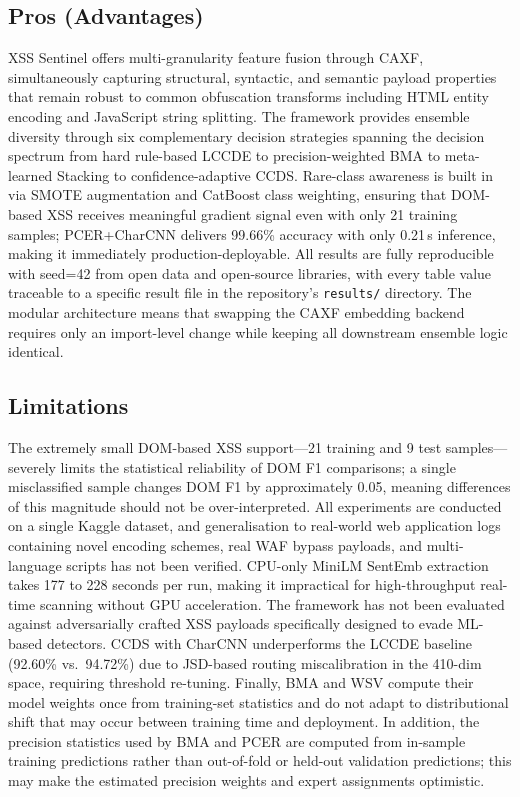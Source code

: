 \documentclass[11pt,a4paper]{article}
\begin{document}
\subsection{Pros (Advantages)}

XSS Sentinel offers multi-granularity feature fusion through CAXF, simultaneously capturing
structural, syntactic, and semantic payload properties that remain robust to common obfuscation
transforms including HTML entity encoding and JavaScript string splitting. The framework provides
ensemble diversity through six complementary decision strategies spanning the decision spectrum from
hard rule-based LCCDE to precision-weighted BMA to meta-learned
Stacking to confidence-adaptive CCDS. Rare-class awareness is built in via SMOTE augmentation and
CatBoost class weighting, ensuring that DOM-based XSS receives meaningful gradient signal even with
only 21 training samples; PCER+CharCNN delivers 99.66\% accuracy with only 0.21\,s inference,
making it immediately production-deployable. All results are fully reproducible with seed=42 from
open data and open-source libraries, with every table value traceable to a specific result file in
the repository's \texttt{results/} directory. The modular architecture means that swapping the CAXF
embedding backend requires only an import-level change while keeping all downstream ensemble logic
identical.

\subsection{Limitations}

The extremely small DOM-based XSS support---21 training and 9 test samples---severely limits the
statistical reliability of DOM F1 comparisons; a single misclassified sample changes DOM F1 by
approximately 0.05, meaning differences of this magnitude should not be over-interpreted. All
experiments are conducted on a single Kaggle dataset, and generalisation to real-world web application
logs containing novel encoding schemes, real WAF bypass payloads, and multi-language scripts has not
been verified. CPU-only MiniLM SentEmb extraction takes 177 to 228 seconds per run, making it
impractical for high-throughput real-time scanning without GPU acceleration. The framework has not
been evaluated against adversarially crafted XSS payloads specifically designed to evade ML-based
detectors. CCDS with CharCNN underperforms the LCCDE baseline (92.60\% vs.\ 94.72\%) due to
JSD-based routing miscalibration in the 410-dim space, requiring threshold re-tuning. Finally, BMA and WSV compute their model weights once from training-set statistics and do not adapt
to distributional shift that may occur between training time and deployment. In addition, the
precision statistics used by BMA and PCER are computed from in-sample training predictions rather
than out-of-fold or held-out validation predictions; this may make the estimated precision weights
and expert assignments optimistic.
\end{document}
